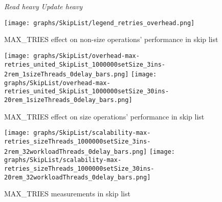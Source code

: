 \documentclass{article}
\begin{document}
\begin{figure*}[htbp]
	\centering
	\medskip
	\textit{Read heavy}\hspace{10cm}
	\textit{Update heavy}\par
        \medskip
        \texttt{[image: graphs/SkipList/legend\_retries\_overhead.png]}\par\vspace{0.5em}
	MAX\_TRIES effect on non-size operations' performance in skip list\par
        \medskip
	\texttt{[image: graphs/SkipList/overhead-max-retries\_united\_SkipList\_1000000setSize\_3ins-2rem\_1sizeThreads\_0delay\_bars.png]}\hspace{2.5em}
	\texttt{[image: graphs/SkipList/overhead-max-retries\_united\_SkipList\_1000000setSize\_30ins-20rem\_1sizeThreads\_0delay\_bars.png]}\vspace{-1.2em}

        \vspace{1.2em}
	MAX\_TRIES effect on size operations' performance in skip list\par
        \medskip
	\texttt{[image: graphs/SkipList/scalability-max-retries\_sizeThreads\_1000000setSize\_3ins-2rem\_32workloadThreads\_0delay\_bars.png]}\hspace{2.5em}
	\texttt{[image: graphs/SkipList/scalability-max-retries\_sizeThreads\_1000000setSize\_30ins-20rem\_32workloadThreads\_0delay\_bars.png]}\vspace{-1.2em}
        \medskip
        \medskip
        \caption{MAX\_TRIES measurements in skip list}\par
	\label{fig:MAX_TRIES SL}
\end{figure*}
\end{document}
